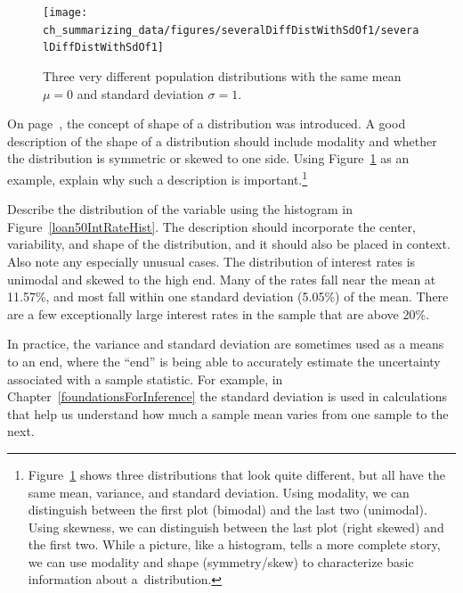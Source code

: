 \begin{figure}
\centering
\texttt{[image: ch\_summarizing\_data/figures/severalDiffDistWithSdOf1/severalDiffDistWithSdOf1]}
\caption{Three very different population distributions
  with the same mean $\mu=0$ and standard deviation $\sigma=1$.}
\label{severalDiffDistWithSdOf1}
\end{figure}

\begin{exercise}
On page~\pageref{shapeFirstDiscussed}, the concept of
shape of a distribution was introduced.
A good description of the shape of a distribution should
include modality and whether the distribution is symmetric
or skewed to one side.
Using Figure~\ref{severalDiffDistWithSdOf1} as an example,
explain why such a description is
important.\footnote{Figure~\ref{severalDiffDistWithSdOf1}
  shows three distributions that look quite different,
  but all have the same mean, variance,
  and standard deviation.
  Using modality, we can distinguish between the
  first plot (bimodal) and the last two (unimodal).
  Using skewness, we can distinguish between the
  last plot (right skewed) and the first two.
  While a picture, like a histogram, tells a more
  complete story, we can use modality and shape
  (symmetry/skew) to characterize basic information
  about a~distribution.}
\end{exercise}

\begin{example}{Describe the distribution of the
     variable using
    the histogram in Figure~\ref{loan50IntRateHist}.
    The description should incorporate the center,
    variability, and shape of the distribution,
    and it should also be placed in context.
    Also note any especially unusual cases.}
  The distribution of interest rates is unimodal
  and skewed to the high end.
  Many of the rates fall near the mean at 11.57\%,
  and most fall within one standard deviation (5.05\%)
  of the mean.
  There are a few exceptionally large interest rates
  in the sample that are above 20\%.
\end{example}

In practice, the variance and standard deviation are sometimes
used as a means to an end, where the ``end'' is being able to
accurately estimate the uncertainty associated with a sample
statistic.
For example, in Chapter~\ref{foundationsForInference}
the standard deviation is used in calculations that help us
understand how much a sample mean varies from one sample
to the next.


